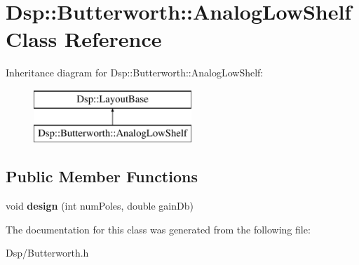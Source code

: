 \hypertarget{classDsp_1_1Butterworth_1_1AnalogLowShelf}{\section{Dsp\-:\-:Butterworth\-:\-:Analog\-Low\-Shelf Class Reference}
\label{classDsp_1_1Butterworth_1_1AnalogLowShelf}
}
Inheritance diagram for Dsp\-:\-:Butterworth\-:\-:Analog\-Low\-Shelf\-:\begin{figure}[H]
\begin{center}
\leavevmode
\includegraphics[height=2.000000cm]{classDsp_1_1Butterworth_1_1AnalogLowShelf}
\end{center}
\end{figure}
\subsection*{Public Member Functions}
\begin{DoxyCompactItemize}
\item 
\hypertarget{classDsp_1_1Butterworth_1_1AnalogLowShelf_acd60631dd58bda16530b9e48d52ecdb4}{void {\bfseries design} (int num\-Poles, double gain\-Db)}\label{classDsp_1_1Butterworth_1_1AnalogLowShelf_acd60631dd58bda16530b9e48d52ecdb4}

\end{DoxyCompactItemize}


The documentation for this class was generated from the following file\-:\begin{DoxyCompactItemize}
\item 
Dsp/Butterworth.\-h\end{DoxyCompactItemize}
